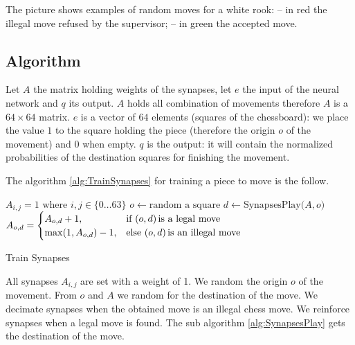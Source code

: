 \documentclass[a4paper,10pt]{article}
\begin{document}
\chessboard[
  setpieces={Re4},
  pgfstyle=straightmove,
  arrow=stealth,
  linewidth=.25ex,
  padding=1ex,
  pgfstyle=straightmove,
  shortenstart=1ex,
  showmover=true,
  color=red!75!white,
  markmoves={e4-g5},
  color=green!75!white,
  markmoves={e4-g4}
]

The picture shows examples of random moves for a white rook: -- in red the
illegal move refused by the supervisor; -- in green the accepted move.

\subsection*{Algorithm}

Let $A$ the matrix holding weights of the synapses, let $e$ the input of the
neural network and $q$ its output. $A$ holds all combination of movements
therefore $A$ is a $64 \times 64$ matrix. $e$ is a vector of $64$ elements
(squares of the chessboard): we place the value $1$ to the square holding the
piece (therefore the origin $o$ of the movement) and $0$ when empty. $q$ is the
output: it will contain the normalized probabilities of the destination squares
for finishing the movement.

\newpage
The algorithm \ref{alg:TrainSynapses} for training a piece to move is the
follow.

\begin{algorithm}
  \label{alg:TrainSynapses}
  \DontPrintSemicolon
  $A_{i,j} = 1 \text{ where } i,j \in \{0 \dotsc 63\}$\;
  {
    $o \gets \text{random a square}$\;
    $d \gets \text{SynapsesPlay(}A,o\text{)}$\;
    $A_{o,d} =
    \begin{cases}
      A_{o,d} + 1,& \text{if } (o, d) \text{\,is a legal move} \\
      \max(1,A_{o,d}) - 1,& \text{else } (o, d) \text{\,is an illegal move}
    \end{cases}
    $\;
  }
  \caption{Train Synapses}
\end{algorithm}

All synapses $A_{i,j}$ are set with a weight of 1. We random the origin $o$ of
the movement. From $o$ and $A$ we random for the destination of the move.  We
decimate synapses when the obtained move is an illegal chess move.  We reinforce
synapses when a legal move is found. The sub algorithm \ref{alg:SynapsesPlay}
gets the destination of the move.
\end{document}
